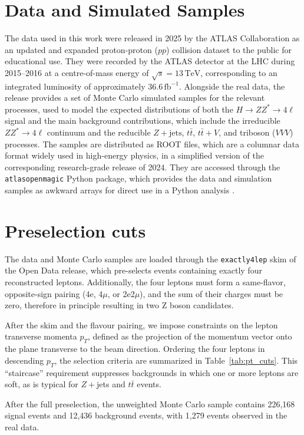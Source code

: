 \documentclass[conference]{IEEEtran}
\begin{document}
{\section{Data and Simulated Samples}
The data used in this work were released in 2025 by the ATLAS Collaboration as an updated and expanded proton-proton (\(pp\)) collision dataset to the public for educational use. They were recorded by the ATLAS detector at the LHC during 2015--2016 at a centre-of-mass energy of \(\sqrt{s} = 13 \, \mathrm{TeV}\), corresponding to an integrated luminosity of approximately \(36.6 \, \mathrm{fb}^{-1}\). Alongside the real data, the release provides a set of Monte Carlo simulated samples for the relevant processes, used to model the expected distributions of both the \(H \rightarrow ZZ^{*} \rightarrow 4\ell\) signal and the main background contributions, which include the irreducible \(ZZ^{*} \rightarrow 4\ell\) continuum and the reducible \(Z+\mathrm{jets}\), \(t\bar{t}\), \(t\bar{t}+V\), and triboson (\(VVV\)) processes. The samples are distributed as ROOT files, which are a columnar data format widely used in high-energy physics, in a simplified version of the corresponding research-grade release of 2024. They are accessed through the \texttt{atlasopenmagic} Python package, which provides the data and simulation samples as awkward arrays for direct use in a Python analysis \cite{ATLASOpenData2020}.

\section{Preselection cuts}
The data and Monte Carlo samples are loaded through the \texttt{exactly4lep} skim of the Open Data release, which pre-selects events containing exactly four reconstructed leptons. Additionally, the four leptons must form a same-flavor, opposite-sign pairing (4e, 4$\mu$, or 2e2$\mu$), and the sum of their charges must be zero, therefore in principle resulting in two Z boson candidates.

After the skim and the flavour pairing, we impose constraints on the lepton transverse momenta $p_T$, defined as the projection of the momentum vector onto the plane transverse to the beam direction. Ordering the four leptons in descending $p_T$, the selection criteria are summarized in Table~\ref{tab:pt_cuts}. This ``staircase'' requirement suppresses backgrounds in which one or more leptons are soft, as is typical for $Z+$jets and $t\bar{t}$ events.

After the full preselection, the unweighted Monte Carlo sample contains 226{,}168 signal events and 12{,}436 background events, with 1{,}279 events observed in the real data. \cite{atlas2018higgsmass}

}
\end{document}
